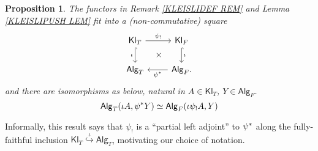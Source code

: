 \documentclass[a4paper,10pt
,draft
]{article}%
\numberwithin{equation}{section}
\numberwithin{figure}{section}
\newtheorem{proposition}[equation]{Proposition}%
\theoremstyle{definition} %
\newcommand{\1}{\ensuremath{\mathbbm 1}}%
\begin{document}
\begin{proposition}\label{PARTADJ PROP}
The functors in Remark \ref{KLEISLIDEF REM} and Lemma \ref{KLEISLIPUSH LEM}
fit into a (non-commutative) square
\begin{equation}\label{PARTADJ EQ}
\begin{tikzcd}
	\mathsf{Kl}_{T} \ar{r}{\psi_!} \ar[hookrightarrow]{d}[swap]{\iota}&
	\mathsf{Kl}_{F} \ar[hookrightarrow]{d}{\iota} \arrow[dl, phantom, "\times"]
\\
	\mathsf{Alg}_{T} &
	\mathsf{Alg}_{F}  \ar{l}{\psi^{\**}}.
\end{tikzcd}
\end{equation}
and there are isomorphisms as below, natural in $A \in \mathsf{Kl}_T$, $Y \in \mathsf{Alg}_F$.
\begin{equation}\label{PARTADJISO EQ}
	\mathsf{Alg}_T(\iota A, \psi^{\**} Y) \simeq
	\mathsf{Alg}_F(\iota \psi_! A,Y)
\end{equation}
\end{proposition}
Informally, this result says that
$\psi_!$ is a ``partial left adjoint'' to $\psi^{\**}$
along the fully-faithful inclusion 
$\mathsf{Kl}_T \overset{\iota}{\hookrightarrow} \mathsf{Alg}_T$,
motivating our choice of notation.
\end{document}
